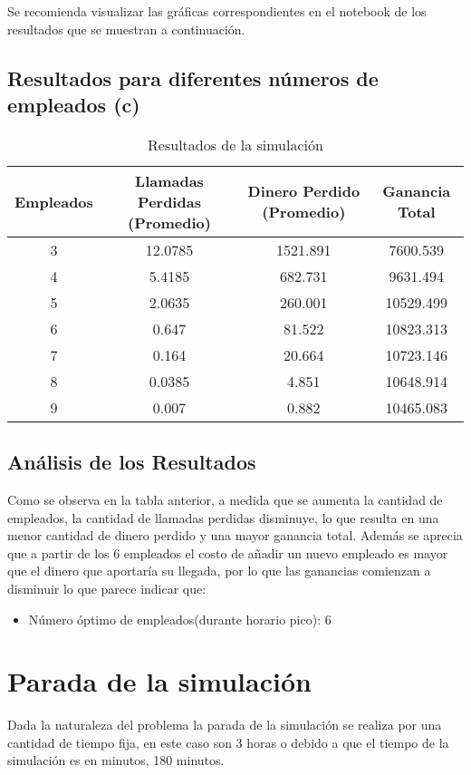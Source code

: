 \documentclass{article}
\begin{document}
Se recomienda visualizar las gráficas correspondientes en el notebook de los resultados que se muestran a continuación.
\subsection*{Resultados para diferentes números de empleados (c)}


\begin{table}[H]
    \centering
    \caption{Resultados de la simulación}
    \begin{tabular}{cccc}
        \toprule
        Empleados & Llamadas Perdidas (Promedio) & Dinero Perdido (Promedio) & Ganancia Total \\
        \midrule
        3 & 12.0785 & 1521.891 & 7600.539 \\
        4 & 5.4185 & 682.731 & 9631.494 \\
        5 & 2.0635 & 260.001 & 10529.499 \\
        6 & 0.647 & 81.522 & 10823.313 \\
        7 & 0.164 & 20.664 & 10723.146 \\
        8 & 0.0385 & 4.851 & 10648.914 \\
        9 & 0.007 & 0.882 & 10465.083 \\
        \bottomrule
    \end{tabular}
\end{table}

\subsection{Análisis de los Resultados}

Como se observa en la tabla anterior, a medida que se aumenta la cantidad de empleados, la cantidad de llamadas perdidas disminuye, lo que resulta en una menor cantidad de dinero perdido y una mayor ganancia total.
Además se aprecia que a partir de los 6 empleados el costo de añadir un nuevo empleado es mayor que el dinero que aportaría su llegada, por lo que las ganancias comienzan a disminuir lo que parece indicar que:

\begin{itemize}
    \item Número óptimo de empleados(durante horario pico): 6
\end{itemize}

\section{Parada de la simulación}
Dada la naturaleza del problema la parada de la simulación se realiza por una cantidad de tiempo fija, en este caso son 3 horas o debido a que el tiempo de la simulación es en minutos, 180 minutos.
\end{document}

